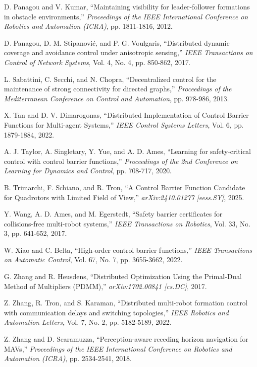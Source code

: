 \begin{thebibliography}{99}
 D. Panagou and V. Kumar, ``Maintaining visibility for leader-follower formations in obstacle environments,'' {\it Proceedings of the IEEE International Conference on Robotics and Automation (ICRA)}, pp. 1811-1816, 2012.

 D. Panagou, D. M. Stipanović, and P. G. Voulgaris, ``Distributed dynamic coverage and avoidance control under anisotropic sensing,'' {\it IEEE Transactions on Control of Network Systems}, Vol. 4, No. 4, pp. 850-862, 2017.

 L. Sabattini, C. Secchi, and N. Chopra, ``Decentralized control for the maintenance of strong connectivity for directed graphs,'' {\it Proceedings of the Mediterranean Conference on Control and Automation}, pp. 978-986, 2013.

 X. Tan and D. V. Dimarogonas, ``Distributed Implementation of Control Barrier Functions for Multi-agent Systems,'' {\it IEEE Control Systems Letters}, Vol. 6, pp. 1879-1884, 2022.

 A. J. Taylor, A. Singletary, Y. Yue, and A. D. Ames, ``Learning for safety-critical control with control barrier functions,'' {\it Proceedings of the 2nd Conference on Learning for Dynamics and Control}, pp. 708-717, 2020.

 B. Trimarchi, F. Schiano, and R. Tron, ``A Control Barrier Function Candidate for Quadrotors with Limited Field of View,'' {\it arXiv:2410.01277 [eess.SY]}, 2025.

 Y. Wang, A. D. Ames, and M. Egerstedt, ``Safety barrier certificates for collisions-free multi-robot systems,'' {\it IEEE Transactions on Robotics}, Vol. 33, No. 3, pp. 641-652, 2017.

 W. Xiao and C. Belta, ``High-order control barrier functions,'' {\it IEEE Transactions on Automatic Control}, Vol. 67, No. 7, pp. 3655-3662, 2022.

 G. Zhang and R. Heusdens, ``Distributed Optimization Using the Primal-Dual Method of Multipliers (PDMM),'' {\it arXiv:1702.00841 [cs.DC]}, 2017.

 Z. Zhang, R. Tron, and S. Karaman, ``Distributed multi-robot formation control with communication delays and switching topologies,'' {\it IEEE Robotics and Automation Letters}, Vol. 7, No. 2, pp. 5182-5189, 2022.

 Z. Zhang and D. Scaramuzza, ``Perception-aware receding horizon navigation for MAVs,'' {\it Proceedings of the IEEE International Conference on Robotics and Automation (ICRA)}, pp. 2534-2541, 2018.
\end{thebibliography}
